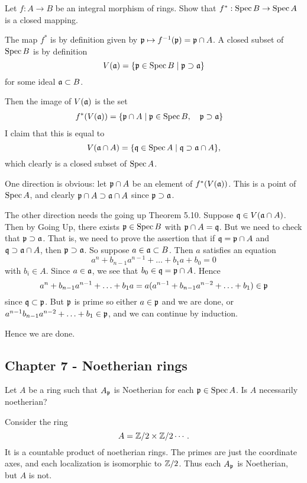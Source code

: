 \documentclass[11pt, english]{article}
\begin{document}
\begin{exc}[Exercise 1]

Let $f:A \to B$ be an integral morphism of rings. Show that $f^\ast:\operatorname{Spec} B \to \operatorname{Spec} A$ is a closed mapping.  
\end{exc}
\begin{sol}
The map $f^\ast$ is by definition given by $\mathfrak{p} \mapsto f^{-1}(\mathfrak{p}) = \mathfrak{p} \cap A$. A closed subset of $\operatorname{Spec} B$ is by definition 
\[
V(\mathfrak{a}) = \{ \mathfrak{p} \in \operatorname{Spec} B \mid \mathfrak{p} \supset \mathfrak{a} \}
\]
for some ideal $\mathfrak{a} \subset B$.

Then the image of $V(\mathfrak{a})$ is the set
\begin{align*}
f^\ast(V(\mathfrak{a})) &= \{ \mathfrak{p} \cap A \mid \mathfrak{p} \in \operatorname{Spec} B, \quad  \mathfrak{p} \supset \mathfrak{a} \} 
\end{align*}
I claim that this is equal to 
\[
V(\mathfrak{a} \cap A) = \{ \mathfrak{q} \in \operatorname{Spec} A \mid \mathfrak{q} \supset \mathfrak{a} \cap A \},
\]
which clearly is a closed subset of $\operatorname{Spec} A$.

One direction is obvious: let $\mathfrak{p} \cap A$ be an element of $f^\ast(V(\mathfrak{a}))$. This is a point of $\operatorname{Spec} A$, and clearly $\mathfrak{p} \cap A \supset \mathfrak{a} \cap A$ since $\mathfrak{p} \supset \mathfrak{a}$.

The other direction needs the going up Theorem 5.10. Suppose $\mathfrak{q} \in V(\mathfrak{a} \cap A)$. Then by Going Up, there exists $\mathfrak{p} \in \operatorname{Spec} B$ with $\mathfrak{p} \cap A = \mathfrak{q}$. But we need to check that $\mathfrak{p} \supset \mathfrak{a}$. That is, we need to prove the assertion that if $\mathfrak{q} = \mathfrak{p} \cap A$ and $\mathfrak{q} \supset \mathfrak{a} \cap A$, then $\mathfrak{p} \supset \mathfrak{a}$. So suppose $a \in \mathfrak{a} \subset B$. Then $a$ satisfies an equation
\[
a^n + b_{n-1}a^{n-1} + \ldots + b_1a+b_0=0
\]
with $b_i \in A$. Since $a \in \mathfrak{a}$, we see that $b_0 \in \mathfrak{q} = \mathfrak{p} \cap A$. Hence
\[
a^n+b_{n-1}a^{n-1}+\ldots+b_1a = a(a^{n-1}+b_{n-1}a^{n-2}+\ldots+b_1) \in \mathfrak{p}
\]
since $\mathfrak{q} \subset \mathfrak{p}$. But $\mathfrak{p}$ is prime so either $a \in \mathfrak{p}$ and we are done, or $a^{n-1}b_{n-1}a^{n-2}+\ldots+b_1 \in \mathfrak{p}$, and we can continue by induction.

Hence we are done.
\end{sol}

\subsection{Chapter 7 - Noetherian rings}

\begin{exc}[Exercise 11]
Let $A$ be a ring such that $A_{\mathfrak{p}}$ is Noetherian for each $\mathfrak{p} \in \operatorname{Spec} A$. Is $A$ necessarily noetherian?
\end{exc}
\begin{sol}
Consider the ring
\[
A= \mathbb{Z}/2 \times \mathbb{Z}/2 \cdots .
\]
It is a countable product of noetherian rings. The primes are just the coordinate axes, and each localization is isomorphic to $\mathbb{Z}/2$. Thus each $A_{\mathfrak{p}}$ is Noetherian, but $A$ is not.
\end{sol}
\end{document}

